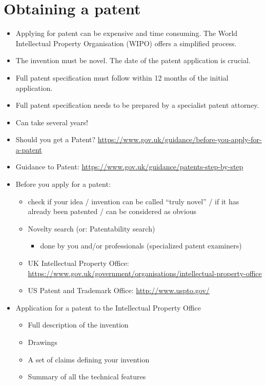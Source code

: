 \documentclass{article}
\begin{document}
\section{Obtaining a patent}
\begin{itemize}
\item Applying for patent can be expensive and time consuming. The World Intellectual Property Organisation (WIPO) offers a simplified process.
\item The invention must be novel. The date of the patent application is crucial.
\item Full patent specification must follow within 12 months of the initial application.
\item Full patent specification needs to be prepared by a specialist patent attorney.
\item Can take several years!
\item Should you get a Patent? \url{https://www.gov.uk/guidance/before-you-apply-for-a-patent}
\item Guidance to Patent: \url{https://www.gov.uk/guidance/patents-step-by-step}
\item Before you apply for a patent:
\begin{itemize}
\item check if your idea / invention can be called ``truly novel'' / if it has already been patented / can be considered as obvious
\item Novelty search (or: Patentability search) 
\begin{itemize}
\item done by you and/or professionals (specialized patent examiners)
\end{itemize}
\item UK Intellectual Property Office: \url{https://www.gov.uk/government/organisations/intellectual-property-office}
\item US Patent and Trademark Office: \url{http://www.uspto.gov/} 
\end{itemize}
\item Application for a patent to the Intellectual Property Office
\begin{itemize}
\item Full description of the invention
\item Drawings
\item A set of claims defining your invention
\item Summary of all the technical features
\end{itemize}
\end{itemize}
\end{document}
